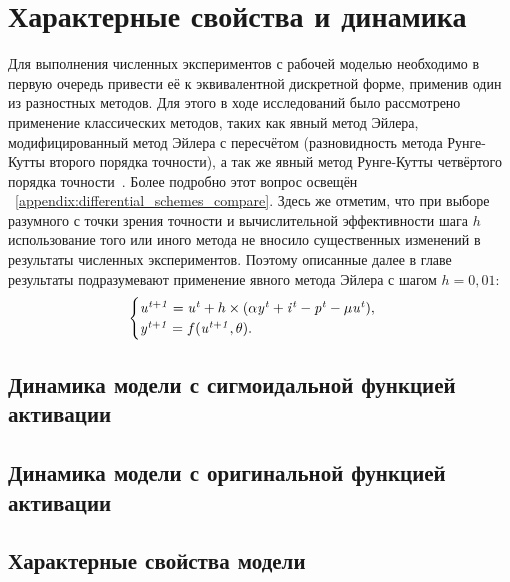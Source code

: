 \section{Характерные свойства и динамика} \label{section:neuron_dynamic}

Для выполнения численных экспериментов с рабочей моделью необходимо в первую очередь привести её к эквивалентной дискретной форме, применив один из разностных методов. Для этого в ходе исследований было рассмотрено применение классических методов, таких как явный метод Эйлера, модифицированный метод Эйлера с пересчётом (разновидность метода Рунге-Кутты второго порядка точности), а так же явный метод Рунге-Кутты четвёртого порядка точности~\cite{Hairer1990}. Более подробно этот вопрос освещён \inappendix~\ref{appendix:differential_schemes_compare}. Здесь же отметим, что при выборе разумного с точки зрения точности и вычислительной эффективности шага $h$ использование того или иного метода не вносило существенных изменений в результаты численных экспериментов. Поэтому описанные далее в главе результаты подразумевают применение явного метода Эйлера с шагом $h = 0,01$:
\begin{equation*}
    \begin{cases}
        \mathit{u^{t+1}} = \mathit{u^{t}} + h \times ( \alpha\mathit{y^{t}} + \mathit{i^{t}} - \mathit{p^{t}} - \mu\mathit{u^{t}} ), \\ 
        \mathit{y^{t+1}} = f(\mathit{u^{t+1}}, \theta).
    \end{cases}
\end{equation*}


\subsection{Динамика модели с сигмоидальной функцией активации}

\subsection{Динамика модели с оригинальной функцией активации}

\subsection{Характерные свойства модели}


